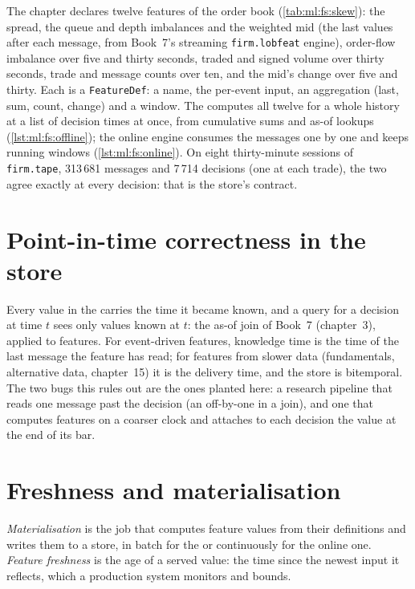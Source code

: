 The chapter declares twelve features of the order book (\cref{tab:ml:fs:skew}): the spread, the queue and depth imbalances
and the weighted mid (the last values after each message, from Book~7's streaming \texttt{firm.lobfeat} engine), order-flow
imbalance over five and thirty seconds, traded and signed volume over thirty seconds, trade and message counts over ten, and
the mid's change over five and thirty. Each is a \texttt{FeatureDef}: a name, the per-event input, an aggregation (last,
sum, count, change) and a window. The  computes all twelve for a whole history at a list of decision times at
once, from cumulative sums and as-of lookups (\cref{lst:ml:fs:offline}); the online engine consumes the messages one by one
and keeps running windows (\cref{lst:ml:fs:online}). On eight thirty-minute sessions of \texttt{firm.tape}, 313\,681 messages
and 7\,714 decisions (one at each trade), the two agree exactly at every decision: that is the store's contract.

\section{Point-in-time correctness in the store}

Every value in the  carries the time it became known, and a query for a decision at time $t$ sees only values
known at $t$: the as-of join of Book~7 (chapter~3), applied to features. For event-driven features, knowledge time is the
time of the last message the feature has read; for features from slower data (fundamentals, alternative data, chapter~15)
it is the delivery time, and the store is bitemporal. The two bugs this rules out are the ones planted here: a research
pipeline that reads one message past the decision (an off-by-one in a join), and one that computes features on a coarser
clock and attaches to each decision the value at the end of its bar.

\section{Freshness and materialisation}

\begin{definition}\label{def:ml:data-and-feature-stores:fresh}
\emph{Materialisation} is the job that computes feature values from their definitions and writes them
to a store, in batch for the  or continuously for the online one. \emph{Feature freshness} is the age of a served value: the time since the newest input it reflects, which a production system monitors
and bounds.
\end{definition}

